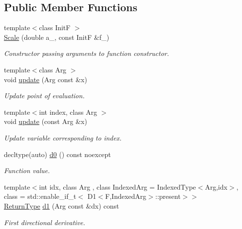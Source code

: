 \subsection*{Public Member Functions}
\begin{DoxyCompactItemize}
\item 
{\footnotesize template$<$class Init\+F $>$ }\\\hyperlink{structFunG_1_1MathematicalOperations_1_1Scale_ab86612b868aaee66786793da2ec7a54a}{Scale} (double a\+\_\+, const Init\+F \&f\+\_\+)
\begin{DoxyCompactList}\small\item\em Constructor passing arguments to function constructor. \end{DoxyCompactList}\item 
{\footnotesize template$<$class Arg $>$ }\\void \hyperlink{structFunG_1_1MathematicalOperations_1_1Scale_aecf868f7b64e89e67053a328642a8fd3}{update} (Arg const \&x)
\begin{DoxyCompactList}\small\item\em Update point of evaluation. \end{DoxyCompactList}\item 
{\footnotesize template$<$int index, class Arg $>$ }\\void \hyperlink{structFunG_1_1MathematicalOperations_1_1Scale_a49b277539bf6582956f68d325ce4a44d}{update} (const Arg \&x)
\begin{DoxyCompactList}\small\item\em Update variable corresponding to index. \end{DoxyCompactList}\item 
decltype(auto) \hyperlink{structFunG_1_1MathematicalOperations_1_1Scale_aec01731655fabb0f6fcfd06493aec4af}{d0} () const noexcept
\begin{DoxyCompactList}\small\item\em Function value. \end{DoxyCompactList}\item 
{\footnotesize template$<$int idx, class Arg , class Indexed\+Arg  = Indexed\+Type$<$\+Arg,idx$>$, class  = std\+::enable\+\_\+if\+\_\+t$<$ D1$<$\+F,\+Indexed\+Arg$>$\+::present$>$$>$ }\\\hyperlink{structFunG_1_1MathematicalOperations_1_1Scale_ac8d3f432c36c678cbf156132e46607ae}{Return\+Type} \hyperlink{structFunG_1_1MathematicalOperations_1_1Scale_adb6db8654d08b056e75d3355c41a2a2b}{d1} (Arg const \&dx) const 
\begin{DoxyCompactList}\small\item\em First directional derivative. \end{DoxyCompactList}\item 

\end{DoxyCompactItemize}
